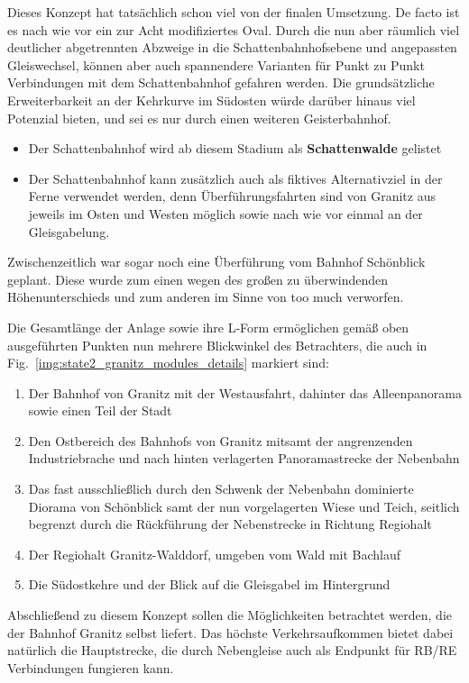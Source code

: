 Dieses Konzept hat tats\"achlich schon viel von der finalen Umsetzung.
De facto ist es nach wie vor ein zur Acht modifiziertes Oval.
Durch die nun aber r\"aumlich viel deutlicher abgetrennten Abzweige in die Schattenbahnhofsebene und angepassten Gleiswechsel, k\"onnen aber auch spannendere Varianten f\"ur Punkt zu Punkt Verbindungen mit dem Schattenbahnhof gefahren werden.
Die grunds\"atzliche Erweiterbarkeit an der Kehrkurve im S\"udosten w\"urde dar\"uber hinaus viel Potenzial bieten, und sei es nur durch einen weiteren Geisterbahnhof.
\begin{itemize}
	\item Der Schattenbahnhof wird ab diesem Stadium als \textbf{Schattenwalde} gelistet
	\item Der Schattenbahnhof kann zus\"atzlich auch als fiktives Alternativziel in der Ferne verwendet werden, denn \"Uberf\"uhrungsfahrten sind von Granitz aus jeweils im Osten und Westen m\"oglich sowie nach wie vor einmal an der Gleisgabelung.
\end{itemize}
Zwischenzeitlich war sogar noch eine \"Uberf\"uhrung vom Bahnhof Sch\"onblick geplant.
Diese wurde zum einen wegen des gro{\ss}en zu \"uberwindenden H\"ohenunterschieds und zum anderen im Sinne von too much verworfen.

Die Gesamtl\"ange der Anlage sowie ihre L-Form erm\"oglichen gem\"a{\ss} oben ausgef\"uhrten Punkten nun mehrere Blickwinkel des Betrachters, die auch in Fig.~\ref{img:state2_granitz_modules_details} markiert sind:
\begin{enumerate}
	\item Der Bahnhof von Granitz mit der Westausfahrt, dahinter das Alleenpanorama sowie einen Teil der Stadt
	\item Den Ostbereich des Bahnhofs von Granitz mitsamt der angrenzenden Industriebrache und nach hinten verlagerten Panoramastrecke der Nebenbahn
	\item Das fast ausschlie{\ss}lich durch den Schwenk der Nebenbahn dominierte Diorama von Sch\"onblick samt der nun vorgelagerten Wiese und Teich, seitlich begrenzt durch die R\"uckf\"uhrung der Nebenstrecke in Richtung Regiohalt
	\item Der Regiohalt Granitz-Walddorf, umgeben vom Wald mit Bachlauf
	\item Die S\"udostkehre und der Blick auf die Gleisgabel im Hintergrund
\end{enumerate}

Abschlie{\ss}end zu diesem Konzept sollen die M\"oglichkeiten betrachtet werden, die der Bahnhof Granitz selbst liefert.
Das h\"ochste Verkehrsaufkommen bietet dabei nat\"urlich die Hauptstrecke, die durch Nebengleise auch als Endpunkt f\"ur RB/RE Verbindungen fungieren kann.

